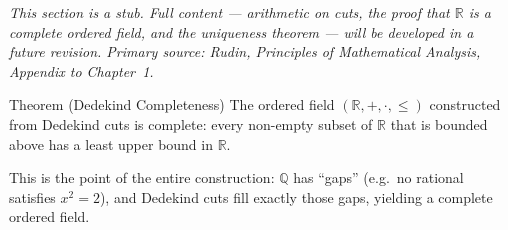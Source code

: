 \begin{remark*}[Status]
\textit{This section is a stub. Full content — arithmetic on cuts, the proof
that $\mathbb{R}$ is a complete ordered field, and the uniqueness theorem —
will be developed in a future revision. Primary source: Rudin,
\textit{Principles of Mathematical Analysis}, Appendix to Chapter~1.}
\end{remark*}

\begin{theorembox}{Theorem (Dedekind Completeness)}
\label{thm:dedekind-complete}
The ordered field $(\mathbb{R}, +, \cdot, \leq)$ constructed from Dedekind cuts
is complete: every non-empty subset of $\mathbb{R}$ that is bounded above
has a least upper bound in $\mathbb{R}$.
\end{theorembox}

\begin{remark*}[Significance]
This is the point of the entire construction: $\mathbb{Q}$ has ``gaps''
(e.g.\ no rational satisfies $x^2 = 2$), and Dedekind cuts fill exactly
those gaps, yielding a complete ordered field.
\end{remark*}
